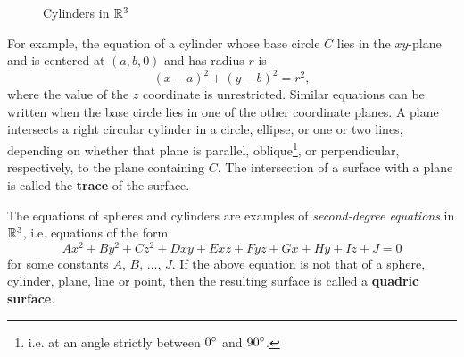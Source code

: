 \begin{figure}[h]
{\begin{tikzpicture}
 \end{tikzpicture}}
 \qquad\qquad
 \caption[]{\quad Cylinders in $\mathbb{R}^{3}$}
 \label{fig:cyls}
\end{figure}

For example, the equation of a cylinder whose base circle $C$ lies in the $xy$-plane and is centered at $(a,b,0)$ and
has radius $r$ is
\begin{equation}\label{eqn:cylxy}
 (x - a)^2 + (y - b)^2 = r^2,
\end{equation}
where the value of the $z$ coordinate is unrestricted. Similar equations can be written when the base circle
lies in one of the other coordinate planes.
A plane intersects a right circular cylinder in a circle, ellipse, or one or two lines,
depending on whether that plane is parallel, oblique\footnote{i.e. at an angle strictly between $0^\circ$ and
$90^\circ$.}, or perpendicular, respectively, to the plane containing $C$.
The intersection of a surface with a plane is called the \textbf{trace} of the surface.

The equations of spheres and cylinders are examples of \emph{second-degree equations}
in $\mathbb{R}^{3}$, i.e. equations of the form
\begin{equation}\label{eqn:quadric}
 Ax^2 + By^2 + Cz^2 + Dxy + Exz + Fyz + Gx + Hy + Iz + J = 0
\end{equation}
for some constants $A$, $B$, $\dots$, $J$. If the above equation is
not that of a sphere, cylinder, plane, line or point, then the resulting surface is called a
\textbf{quadric surface}.

